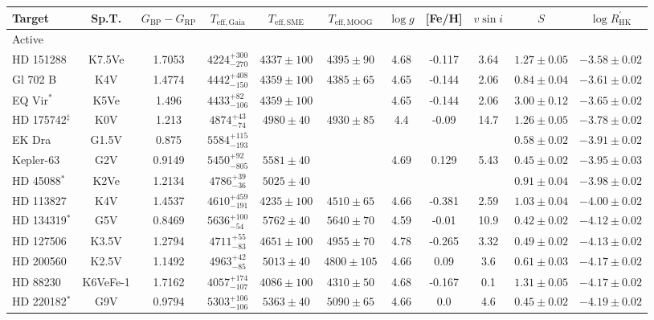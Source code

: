 \begin{tiny}
\begin{longtable}{l|c|c|ccc|ccc|cc}
Target & Sp.T. & $G_\mathrm{BP} - G_\mathrm{RP}$ & $T_\mathrm{eff,Gaia}$ & $T_\mathrm{eff, SME}$ & $T_\mathrm{eff, MOOG}$ & $\log g$ & [Fe/H] & $v \sin i$ & $S$ & $\log R^\prime_\mathrm{HK}$ \\ \hline
Active & & & & & & & & & & \\
HD 151288 & K7.5Ve & 1.7053 & $4224^{+300}_{-270}$ & $4337 \pm 100$ & $4395 \pm 90$ & 4.68 & -0.117 & 3.64 & $1.27 \pm 0.05$ & $-3.58 \pm 0.02$ \\
Gl 702 B & K4V & 1.4774 & $4442^{+408}_{-150}$ & $4359 \pm 100$ & $4385 \pm 65$ & 4.65 & -0.144 & 2.06 & $0.84 \pm 0.04$ & $-3.61 \pm 0.02$ \\
EQ Vir$^*$ & K5Ve & 1.496 & $4433^{+82}_{-106}$ & $4359 \pm 100$ &  & 4.65 & -0.144 & 2.06 & $3.00 \pm 0.12$ & $-3.65 \pm 0.02$ \\
HD 175742$^\ddagger$ & K0V & 1.213 & $4874^{+43}_{-74}$ & $4980 \pm 40$ & $4930 \pm 85$ & 4.4 & -0.09 & 14.7 & $1.26 \pm 0.05$ & $-3.78 \pm 0.02$ \\
EK Dra & G1.5V & 0.875 & $5584^{+115}_{-193}$ &  &  &  &  &  & $0.58 \pm 0.02$ & $-3.91 \pm 0.02$  \\
Kepler-63 & G2V & 0.9149 & $5450^{+92}_{-805}$ & $5581 \pm 40$ &  & 4.69 & 0.129 & 5.43 & $0.45 \pm 0.02$ & $-3.95 \pm 0.03$ \\
HD 45088$^*$ & K2Ve & 1.2134 & $4786^{+39}_{-36}$ & $5025 \pm 40$ &  &  &  &  & $0.91 \pm 0.04$ & $-3.98 \pm 0.02$ \\
HD 113827 & K4V & 1.4537 & $4610^{+459}_{-191}$ & $4235 \pm 100$ & $4510 \pm 65$ & 4.66 & -0.381 & 2.59 & $1.03 \pm 0.04$ & $-4.00 \pm 0.02$ \\
HD 134319$^*$ & G5V & 0.8469 & $5636^{+100}_{-54}$ & $5762 \pm 40$ & $5640 \pm 70$ & 4.59 & -0.01 & 10.9 & $0.42 \pm 0.02$ & $-4.12 \pm 0.02$ \\
HD 127506 & K3.5V & 1.2794 & $4711^{+55}_{-83}$ & $4651 \pm 100$ & $4955 \pm 70$ & 4.78 & -0.265 & 3.32 & $0.49 \pm 0.02$ & $-4.13 \pm 0.02$ \\
HD 200560 & K2.5V & 1.1492 & $4963^{+42}_{-85}$ & $5013 \pm 40$ & $4800 \pm 105$ & 4.66 & 0.09 & 3.6 & $0.61 \pm 0.03$ & $-4.17 \pm 0.02$ \\
HD 88230 & K6VeFe-1 & 1.7162 & $4057^{+174}_{-107}$ & $4086 \pm 100$ & $4310 \pm 50$ & 4.68 & -0.167 & 0.1 & $1.31 \pm 0.05$ & $-4.17 \pm 0.02$ \\
HD 220182$^*$ & G9V & 0.9794 & $5303^{+106}_{-106}$ & $5363 \pm 40$ & $5090 \pm 65$ & 4.66 & 0.0 & 4.6 & $0.45 \pm 0.02$ & $-4.19 \pm 0.02$ \\

\end{longtable}
\end{tiny}
